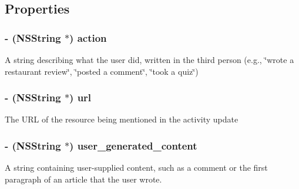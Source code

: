 \subsection{Properties}
\hypertarget{interface_j_r_activity_object_ac7f87878433a7d69fc5c8677fc317d6a}{
\subsubsection[{action}]{\setlength{\rightskip}{0pt plus 5cm}-\/ (NSString $\ast$) action}}
\label{interface_j_r_activity_object_ac7f87878433a7d69fc5c8677fc317d6a}
A string describing what the user did, written in the third person (e.g., \char`\"{}wrote a restaurant review\char`\"{}, \char`\"{}posted a comment\char`\"{}, \char`\"{}took a quiz\char`\"{}) \hypertarget{interface_j_r_activity_object_a113d240b8b15e625fb0005fbffd00c17}{
\subsubsection[{url}]{\setlength{\rightskip}{0pt plus 5cm}-\/ (NSString $\ast$) url}}
\label{interface_j_r_activity_object_a113d240b8b15e625fb0005fbffd00c17}
The URL of the resource being mentioned in the activity update \hypertarget{interface_j_r_activity_object_a965d03730324bcda4374450ad648505b}{
\subsubsection[{user\_\-generated\_\-content}]{\setlength{\rightskip}{0pt plus 5cm}-\/ (NSString $\ast$) user\_\-generated\_\-content}}
\label{interface_j_r_activity_object_a965d03730324bcda4374450ad648505b}
A string containing user-\/supplied content, such as a comment or the first paragraph of an article that the user wrote.

